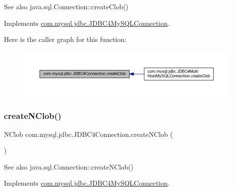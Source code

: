 \begin{DoxySeeAlso}{See also}
java.\+sql.\+Connection\+::create\+Clob() 
\end{DoxySeeAlso}


Implements \mbox{\hyperlink{interfacecom_1_1mysql_1_1jdbc_1_1_j_d_b_c4_my_s_q_l_connection}{com.\+mysql.\+jdbc.\+J\+D\+B\+C4\+My\+S\+Q\+L\+Connection}}.

Here is the caller graph for this function\+:
\nopagebreak
\begin{figure}[H]
\begin{center}
\leavevmode
\includegraphics[width=350pt]{classcom_1_1mysql_1_1jdbc_1_1_j_d_b_c4_connection_a289c31cdb97f40e0fb1411cb0600b212_icgraph}
\end{center}
\end{figure}
\mbox{\label{classcom_1_1mysql_1_1jdbc_1_1_j_d_b_c4_connection_a8be144d15039acec709f079aefcbb1be}} 
\subsubsection{\texorpdfstring{create\+N\+Clob()}{createNClob()}}
{\footnotesize\ttfamily N\+Clob com.\+mysql.\+jdbc.\+J\+D\+B\+C4\+Connection.\+create\+N\+Clob (\begin{DoxyParamCaption}{ }\end{DoxyParamCaption})}

\begin{DoxySeeAlso}{See also}
java.\+sql.\+Connection\+::create\+N\+Clob() 
\end{DoxySeeAlso}


Implements \mbox{\hyperlink{interfacecom_1_1mysql_1_1jdbc_1_1_j_d_b_c4_my_s_q_l_connection}{com.\+mysql.\+jdbc.\+J\+D\+B\+C4\+My\+S\+Q\+L\+Connection}}.

